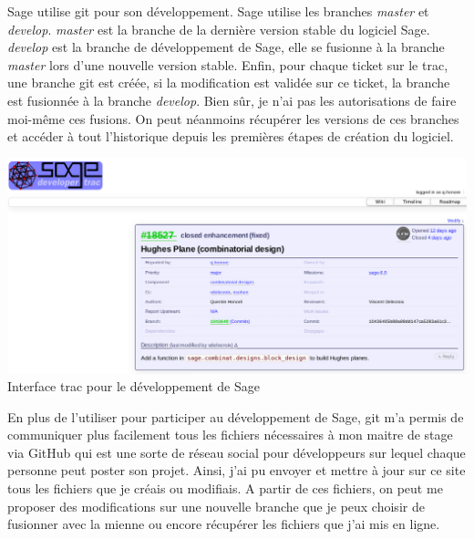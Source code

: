 \documentclass[a4paper]{article}
\begin{document}
Sage utilise git pour son développement. Sage utilise les branches \textit{master} et \textit{develop}. \textit{master} est la branche de la dernière version stable du logiciel Sage. \textit{develop} est la branche de développement de Sage, elle se fusionne à la branche \textit{master} lors d'une nouvelle version stable. Enfin, pour chaque ticket sur le trac, une branche git est créée, si la modification est validée sur ce ticket, la branche est fusionnée à la branche \textit{develop}. Bien sûr, je n'ai pas les autorisations de faire moi-même ces fusions. On peut néanmoins récupérer les versions de ces branches et accéder à tout l'historique depuis les premières étapes de création du logiciel. \vspace{2\baselineskip}\\
\begin{center}
  \includegraphics[scale=0.5]{trac.png}\\
  Interface trac pour le développement de Sage
\end{center}
\vspace{1\baselineskip}
En plus de l'utiliser pour participer au développement de Sage, git m'a permis de communiquer plus facilement tous les fichiers nécessaires à mon maitre de stage via GitHub qui est une sorte de réseau social pour développeurs sur lequel chaque personne peut poster son projet. Ainsi, j'ai pu envoyer et mettre à jour sur ce site tous les fichiers que je créais ou modifiais. A partir de ces fichiers, on peut me proposer des modifications sur une nouvelle branche que je peux choisir de fusionner avec la mienne ou encore récupérer les fichiers que j'ai mis en ligne.


\newpage
\thispagestyle{empty}
\end{document}

